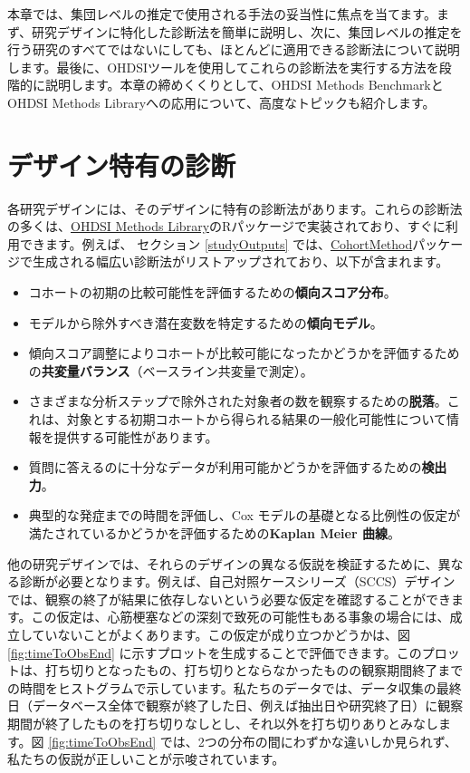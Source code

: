 \documentclass[
  11pt]{book}
\theoremstyle{definition}
\theoremstyle{definition}
\theoremstyle{definition}
\theoremstyle{definition}
\theoremstyle{remark}
\begin{document}
本章では、集団レベルの推定で使用される手法の妥当性に焦点を当てます。まず、研究デザインに特化した診断法を簡単に説明し、次に、集団レベルの推定を行う研究のすべてではないにしても、ほとんどに適用できる診断法について説明します。最後に、OHDSIツールを使用してこれらの診断法を実行する方法を段階的に説明します。本章の締めくくりとして、OHDSI Methods BenchmarkとOHDSI Methods Libraryへの応用について、高度なトピックも紹介します。

\section{デザイン特有の診断}\label{ux30c7ux30b6ux30a4ux30f3ux7279ux6709ux306eux8a3aux65ad}


各研究デザインには、そのデザインに特有の診断法があります。これらの診断法の多くは、\href{https://ohdsi.github.io/MethodsLibrary/}{OHDSI Methods Library}のRパッケージで実装されており、すぐに利用できます。例えば、 セクション \ref{studyOutputs} では、\href{https://ohdsi.github.io/CohortMethod/}{CohortMethod}パッケージで生成される幅広い診断法がリストアップされており、以下が含まれます。

\begin{itemize}
\item
  コホートの初期の比較可能性を評価するための\textbf{傾向スコア分布}。
\item
  モデルから除外すべき潜在変数を特定するための\textbf{傾向モデル}。
\item
  傾向スコア調整によりコホートが比較可能になったかどうかを評価するための\textbf{共変量バランス}（ベースライン共変量で測定）。
\item
  さまざまな分析ステップで除外された対象者の数を観察するための\textbf{脱落}。これは、対象とする初期コホートから得られる結果の一般化可能性について情報を提供する可能性があります。
\item
  質問に答えるのに十分なデータが利用可能かどうかを評価するための\textbf{検出力}。
\item
  典型的な発症までの時間を評価し、Cox モデルの基礎となる比例性の仮定が満たされているかどうかを評価するための\textbf{Kaplan Meier 曲線}。
\end{itemize}

他の研究デザインでは、それらのデザインの異なる仮説を検証するために、異なる診断が必要となります。例えば、自己対照ケースシリーズ（SCCS）デザインでは、観察の終了が結果に依存しないという必要な仮定を確認することができます。この仮定は、心筋梗塞などの深刻で致死の可能性もある事象の場合には、成立していないことがよくあります。この仮定が成り立つかどうかは、図 \ref{fig:timeToObsEnd} に示すプロットを生成することで評価できます。このプロットは、打ち切りとなったもの、打ち切りとならなかったものの観察期間終了までの時間をヒストグラムで示しています。私たちのデータでは、データ収集の最終日（データベース全体で観察が終了した日、例えば抽出日や研究終了日）に観察期間が終了したものを打ち切りなしとし、それ以外を打ち切りありとみなします。図 \ref{fig:timeToObsEnd} では、2つの分布の間にわずかな違いしか見られず、私たちの仮説が正しいことが示唆されています。
\end{document}
